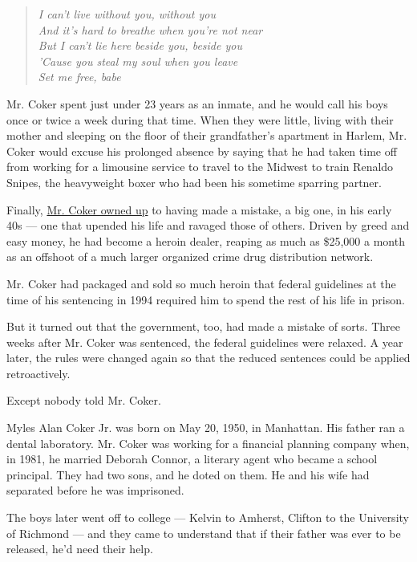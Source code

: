 \begin{quote}
\emph{I can't live without you, without you}\\
\emph{And it's hard to breathe when you're not near}\\
\emph{But I can't lie here beside you, beside you}\\
\emph{'Cause you steal my soul when you leave}\\
\emph{Set me free, babe}
\end{quote}

Mr. Coker spent just under 23 years as an inmate, and he would call his
boys once or twice a week during that time. When they were little,
living with their mother and sleeping on the floor of their
grandfather's apartment in Harlem, Mr. Coker would excuse his prolonged
absence by saying that he had taken time off from working for a
limousine service to travel to the Midwest to train Renaldo Snipes, the
heavyweight boxer who had been his sometime sparring partner.

Finally,
\href{https://www.nytimes3xbfgragh.onion/2014/01/29/nyregion/greed-just-took-me-recalls-a-father-who-led-a-secret-life-of-crime.html}{Mr.
Coker owned up} to having made a mistake, a big one, in his early 40s
--- one that upended his life and ravaged those of others. Driven by
greed and easy money, he had become a heroin dealer, reaping as much as
\$25,000 a month as an offshoot of a much larger organized crime drug
distribution network.

Mr. Coker had packaged and sold so much heroin that federal guidelines
at the time of his sentencing in 1994 required him to spend the rest of
his life in prison.

But it turned out that the government, too, had made a mistake of sorts.
Three weeks after Mr. Coker was sentenced, the federal guidelines were
relaxed. A year later, the rules were changed again so that the reduced
sentences could be applied retroactively.

Except nobody told Mr. Coker.

Myles Alan Coker Jr. was born on May 20, 1950, in Manhattan. His father
ran a dental laboratory. Mr. Coker was working for a financial planning
company when, in 1981, he married Deborah Connor, a literary agent who
became a school principal. They had two sons, and he doted on them. He
and his wife had separated before he was imprisoned.

The boys later went off to college --- Kelvin to Amherst, Clifton to the
University of Richmond --- and they came to understand that if their
father was ever to be released, he'd need their help.

